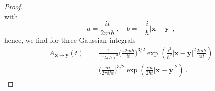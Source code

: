 \begin{proof}
\begin{equation*}
        \end{equation*}
        with 
        \begin{equation*}
            a = \frac{i t}{2 m \hbar} ~, \quad b = - \frac{i}{\hbar} |\mathbf x - \mathbf y| ~,
        \end{equation*}
        hence, we find for three Gaussian integrals
        \begin{equation*}
            \begin{aligned}
            A_{\mathbf x \rightarrow \mathbf y} (t) & = \frac{1}{(2 \pi \hbar)^3} \Big ( \frac{\pi 2 m \hbar}{i t} \Big)^{3/2} \exp( \frac{i^2}{\hbar^2} |\mathbf x - \mathbf y|^2 \frac{2 m \hbar}{4 i t}) \\ & = \Big ( \frac{m}{2 \pi i \hbar t} \Big)^{3/2} \exp(\frac{i m}{2 \hbar t} |\mathbf x - \mathbf y|^2) ~.
        \end{aligned}
        \end{equation*}
    \end{proof}

